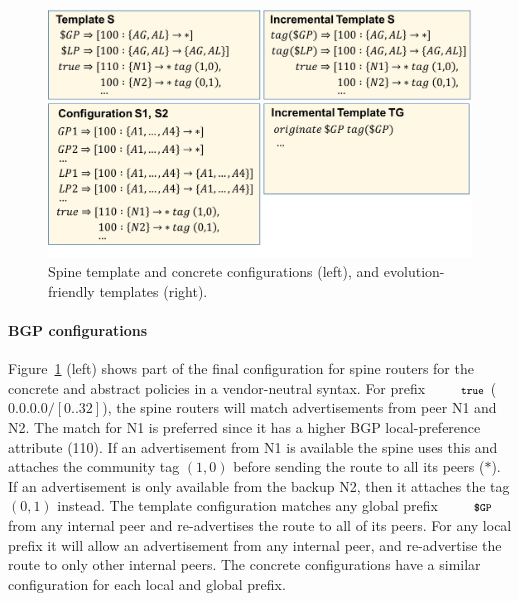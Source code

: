 \documentclass[numbers, 10pt, preprint]{sigplanconf}
\newcommand{\para}[1]{\paragraph*{\textbf{#1}}}
\newcommand{\CD}[1]{\texttt{\small #1}}  %
\newcommand{\True}{\CD{true}}
\begin{document}
\begin{figure}[t!]
  \begin{center}
    \includegraphics[width=\columnwidth]{figures/configs}
  \end{center}
  \vspace{-1em}
  \caption{Spine template and concrete configurations (left), and evolution-friendly templates (right).}
  \label{fig:bgp-configs}
\end{figure}


\para{BGP configurations}

Figure~\ref{fig:bgp-configs} (left) shows part of the final configuration for spine routers for the concrete and abstract policies in a vendor-neutral syntax.
%
For prefix $\True$ ($0.0.0.0/[0..32]$), the spine routers will match advertisements from peer N1 and N2. The match for N1 is preferred since it has a higher BGP local-preference attribute (110). If an advertisement from N1 is available the spine uses this and attaches the community tag $(1,0)$ before sending the route to all its peers ($*$). If an advertisement is only available from the backup N2, then it attaches the tag $(0,1)$ instead.
%
The template configuration matches any global prefix $\CD{\$GP}$ from any internal peer and re-advertises the route to all of its peers. For any local prefix it will allow an advertisement from any internal peer, and re-advertise the route to only other internal peers. The concrete configurations have a similar configuration for each local and global prefix.

\newcommand{\Con}{\text{con}}
\newcommand{\Pfx}{\mathit{pfx}}%
\end{document}
